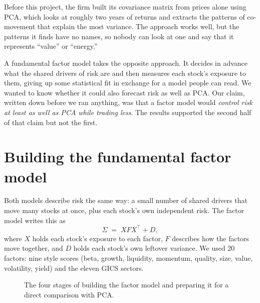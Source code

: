 \documentclass[11pt,letterpaper]{article}
\begin{document}
Before this project, the firm built its covariance matrix from prices alone using PCA, which
looks at roughly two years of returns and extracts the patterns of co-movement that explain
the most variance. The approach works well, but the patterns it finds have no names, so
nobody can look at one and say that it represents ``value'' or ``energy.''

A fundamental factor model takes the opposite approach. It decides in advance what the
shared drivers of risk are and then measures each stock's exposure to them, giving up some
statistical fit in exchange for a model people can read. We wanted to know whether it could
also forecast risk as well as PCA. Our claim, written down before we ran anything, was that
a factor model would \emph{control risk at least as well as PCA while trading less}. The
results supported the second half of that claim but not the first.

\section{Building the fundamental factor model}

Both models describe risk the same way: a small number of shared drivers that move many
stocks at once, plus each stock's own independent risk. The factor model writes this as
\[
\Sigma \;=\; X F X^{\top} + D ,
\]
where $X$ holds each stock's exposure to each factor, $F$ describes how the factors move
together, and $D$ holds each stock's own leftover variance. We used 20 factors: nine style
scores (beta, growth, liquidity, momentum, quality, size, value, volatility, yield) and the
eleven GICS sectors.

\begin{figure}[H]
\centering
{}
\caption{The four stages of building the factor model and preparing it for a direct
comparison with PCA.}
\end{figure}
\end{document}
